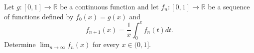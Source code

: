 Let $g:[0,1]\rightarrow \mathbb{R}$ be a continuous function and let $f_{n}:[0,1]\rightarrow \mathbb{R}$ be a
sequence of functions defined by $f_{0}(x)=g(x)$ and
$$f_{n+1}(x)=\frac{1}{x}\int_{0}^{x}f_{n}(t)dt.$$Determine $\lim_{n\to \infty}f_{n}(x)$ for every $x\in (0,1]$.